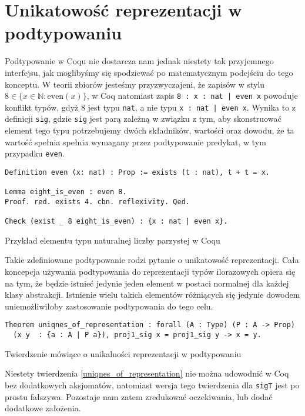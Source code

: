 \section{Unikatowość reprezentacji w podtypowaniu}
Podtypowanie w Coqu nie dostarcza nam jednak niestety tak przyjemnego interfejsu, jak moglibyśmy się spodziewać po matematycznym podejściu do tego konceptu. W teorii zbiorów jesteśmy przyzwyczajeni, że zapisów w stylu $8 \in \{x \in \mathbb{N}: \textrm{even}(x)\} $, w Coq natomiast zapis \texttt{8 : {x : nat | even x}} powoduje konflikt typów, gdyż 8 jest typu \texttt{nat}, a nie typu \texttt{{x : nat | even x}}. Wynika to z  definicji \texttt{sig}, gdzie \texttt{sig} jest parą zależną w związku z tym, aby skonstruować element tego typu potrzebujemy dwóch składników, wartości oraz dowodu, że ta wartość spełnia spełnia wymagany przez podtypowanie predykat, w tym przypadku \texttt{even}.

\begin{code}
\begin{verbatim}
Definition even (x: nat) : Prop := exists (t : nat), t + t = x.

Lemma eight_is_even : even 8.
Proof. red. exists 4. cbn. reflexivity. Qed.

Check (exist _ 8 eight_is_even) : {x : nat | even x}.
\end{verbatim}
\caption{Przykład elementu typu naturalnej liczby parzystej w Coqu}
\end{code}
Takie zdefiniowane podtypowanie rodzi pytanie o unikatowość reprezentacji. Cała koncepcja używania podtypowania do reprezentacji typów ilorazowych opiera się na tym, że będzie istnieć jedynie jeden element w postaci normalnej dla każdej klasy abstrakcji. Istnienie wielu takich elementów różniących się jedynie dowodem uniemożliwiłoby zastosowanie podtypowania do tego celu.
\begin{code}
\begin{verbatim}
Theorem uniqnes_of_representation : forall (A : Type) (P : A -> Prop) 
  (x y  : {a : A | P a}), proj1_sig x = proj1_sig y -> x = y.
\end{verbatim}
\caption{Twierdzenie mówiące o unikalności reprezentacji w podtypowaniu}
\label{uniqnes_of_representation}
\end{code}
Niestety twierdzenia \ref{uniqnes_of_representation} nie można udowodnić w Coq bez dodatkowych aksjomatów, natomiast wersja tego twierdzenia dla \texttt{sigT} jest po prostu fałszywa. Pozostaje nam zatem zredukować oczekiwania, lub dodać dodatkowe założenia.
